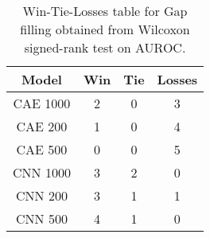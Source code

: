 \begin{table}
\centering
\caption{Win-Tie-Losses table for Gap filling obtained from Wilcoxon signed-rank test on AUROC.}
\label{tab:gap_filling_model_training_data_comparison_AUROC}
\begin{tabular}{|c|c|c|c|}
\toprule
\textbf{Model} &  \textbf{Win} &  \textbf{Tie} &  \textbf{Losses} \\
\midrule
      CAE 1000 &             2 &             0 &                3 \\
       CAE 200 &             1 &             0 &                4 \\
       CAE 500 &             0 &             0 &                5 \\
      CNN 1000 &             3 &             2 &                0 \\
       CNN 200 &             3 &             1 &                1 \\
       CNN 500 &             4 &             1 &                0 \\
\bottomrule
\end{tabular}
\end{table}
